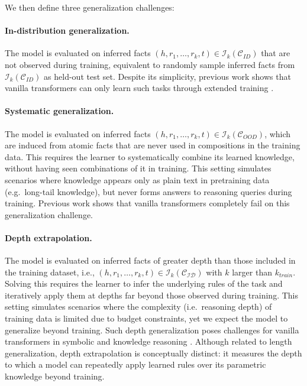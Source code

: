 \documentclass{article} %
\newcommand{\yy}[1]{\textcolor{blue}{[Yuekun: #1]}}
\begin{document}
We then define three generalization challenges:
\paragraph{In-distribution generalization.}
The model is evaluated on inferred facts $(h, r_1, \dots, r_k, t) \in \mathcal{I}_k(\mathcal{C}_{ID})$ that are not observed during training, equivalent to randomly sample inferred facts from $\mathcal{I}_k(\mathcal{C}_{ID})$ as held-out test set. 
Despite its simplicity, previous work shows that vanilla transformers can only learn such tasks through extended training \citep{10.5555/3737916.3740933}.

\paragraph{Systematic generalization.}
The model is evaluated on inferred facts $(h, r_1, \dots, r_k, t) \in \mathcal{I}_k(\mathcal{C}_{OOD})$, which are induced from atomic facts that are never used in compositions in the training data. 
This requires the learner to systematically combine its learned knowledge, without having seen combinations of it in training. 
This setting simulates scenarios where knowledge appears only as plain text in pretraining data (e.g.\ long-tail knowledge), but never forms answers to reasoning queries during training. 
Previous work \citep{10.5555/3737916.3740933} shows that vanilla transformers completely fail on this generalization challenge.

\paragraph{Depth extrapolation.}
The model is evaluated on inferred facts of greater depth than those included in the training dataset, i.e., $(h, r_1, \dots, r_k, t) \in \mathcal{I}_k(\mathcal{C_{ID}})$ with $k$ larger than $k_{train}$.
Solving this requires the learner to infer the underlying rules of the task and iteratively apply them at depths far beyond those observed during training. 
This setting simulates scenarios where the complexity (i.e.\ reasoning depth) of training data is limited due to budget constraints, yet we expect the model to generalize beyond training.
Such depth generalization poses challenges for vanilla transformers in symbolic \citep{kim-linzen-2020-cogs} and knowledge reasoning \citep{yao-etal-2025-language-models}.
Although related to length generalization, depth extrapolation is conceptually distinct: it measures the depth to which a model can repeatedly apply learned rules over its parametric knowledge beyond training.
\end{document}

